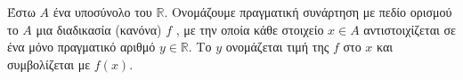 Έστω $Α$ ένα υποσύνολο του $ \mathbb{R} $. Ονομάζουμε πραγματική συνάρτηση με πεδίο ορισμού το $Α$ μια διαδικασία (κανόνα) $f$ , με την οποία κάθε στοιχείο $x\in A$ αντιστοιχίζεται σε ένα μόνο πραγματικό αριθμό $y\in \mathbb{R}$. Το $y$ ονομάζεται τιμή της $f$ στο $x$ και συμβολίζεται με $f(x)$.
